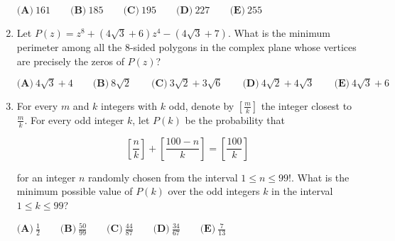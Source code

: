 \documentclass{article}
\begin{document}
\begin{enumerate}[label=\arabic*., itemsep=0.5em]
\(\textbf{(A)}\ 161 \qquad \textbf{(B)}\ 185 \qquad \textbf{(C)}\  195 \qquad \textbf{(D)}\  227 \qquad \textbf{(E)}\  255\)\par \vspace{0.5em}\item Let \(P(z) = z^8 + \left(4\sqrt{3} + 6\right)z^4 - \left(4\sqrt{3} + 7\right)\). What is the minimum perimeter among all the \(8\)-sided polygons in the complex plane whose vertices are precisely the zeros of \(P(z)\)?

\(\textbf{(A)}\ 4\sqrt{3} + 4 \qquad \textbf{(B)}\ 8\sqrt{2} \qquad \textbf{(C)}\  3\sqrt{2} + 3\sqrt{6} \qquad \textbf{(D)}\  4\sqrt{2} + 4\sqrt{3} \qquad \textbf{(E)}\  4\sqrt{3} + 6\)\par \vspace{0.5em}\item For every \(m\) and \(k\) integers with \(k\) odd, denote by \(\left[\frac{m}{k}\right]\) the integer closest to \(\frac{m}{k}\). For every odd integer \(k\), let \(P(k)\) be the probability that


\begin{equation*}
\left[\frac{n}{k}\right] + \left[\frac{100 - n}{k}\right] = \left[\frac{100}{k}\right]
\end{equation*}


for an integer \(n\) randomly chosen from the interval \(1 \leq n \leq 99!\). What is the minimum possible value of \(P(k)\) over the odd integers \(k\) in the interval \(1 \leq k \leq 99\)?

\(\textbf{(A)}\ \frac{1}{2} \qquad \textbf{(B)}\ \frac{50}{99} \qquad \textbf{(C)}\ \frac{44}{87} \qquad \textbf{(D)}\  \frac{34}{67} \qquad \textbf{(E)}\  \frac{7}{13}\)\par \vspace{0.5em}\end{enumerate}
\end{document}
